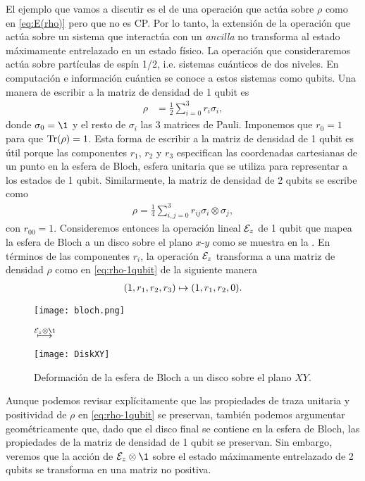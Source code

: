 El ejemplo que vamos a discutir es el de una operación que actúa 
sobre $\rho$ como en \eqref{eq:E(rho)} pero que no es CP. Por lo tanto,
la extensión de la operación que actúa sobre un sistema que interactúa con un 
\textit{ancilla} no transforma al estado máximamente entrelazado en 
un estado físico. La operación que consideraremos 
actúa sobre partículas de espín 1/2, i.e. sistemas cuánticos de
dos niveles. En computación e información cuántica
se conoce a estos sistemas como qubits. Una manera
de escribir a la matriz de densidad de 1 qubit es
\begin{align}
\rho&=\frac{1}{2}\sum_{i=0}^{3} r_i\sigma_i,
\label{eq:rho-1qubit}
\end{align}
donde $\sigma_0=\1$ y el resto de $\sigma_i$ las 3 matrices de Pauli.
Imponemos que $r_0=1$ para que $\Tr(\rho)=1$.
Esta forma de escribir a la matriz de densidad de 1 qubit es útil porque
las componentes $r_1$, $r_2$ y $r_3$ especifican las coordenadas 
cartesianas de un punto en la esfera de Bloch, esfera unitaria que 
se utiliza para representar a los estados de 1 qubit. Similarmente, 
la matriz de densidad de 2 qubits se escribe como~\cite{nielsen_chuang_2011}
\begin{align}\label{eq:rho-2qubits}
\rho=\frac{1}{4}\sum _{i,j=0}^{3}r_{ij}\sigma_i\otimes\sigma_j,
\end{align}
con $r_{00}=1$.
Consideremos entonces la operación lineal $\mathcal{E}_z$ de 1 qubit
que mapea la esfera de Bloch a un disco sobre el plano $x$-$y$ 
como se muestra en la .
En términos de las componentes $r_i$, la operación $\mathcal{E}_z$ 
transforma a una matriz de densidad $\rho$ como en 
\eqref{eq:rho-1qubit} de la siguiente manera
\begin{align}
\qty(1,r_1,r_2,r_3)\mapsto\qty(1,r_1,r_2,0).
\end{align}
\begin{figure}%
\centering
\begin{minipage}{.4\textwidth}
\centering
\texttt{[image: bloch.png]}
\end{minipage}
$\stackrel{\E_{z}\otimes\1 \vspace{1cm}}{\longmapsto}$
\begin{minipage}{0.4\textwidth}
\centering
\texttt{[image: DiskXY]}
\end{minipage}
\caption{
Deformación de la esfera de Bloch a un disco sobre el plano $XY$.}
\label{fig:qtm-op-motivation}
\end{figure} %
Aunque podemos revisar explícitamente que las propiedades 
de traza unitaria y positividad de $\rho$ en \eqref{eq:rho-1qubit}
se preservan, también podemos argumentar geométricamente
que, dado que el disco final se contiene en la esfera de Bloch, 
las propiedades de la matriz de densidad de 1 qubit se preservan.
Sin embargo, veremos que la acción de $\E_z\ot \1$ 
sobre el estado máximamente entrelazado de 2 qubits 
se transforma en una matriz no positiva.


